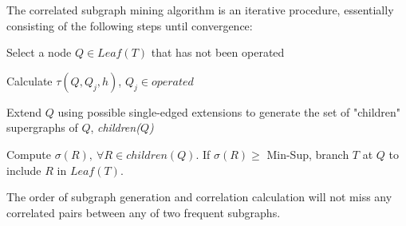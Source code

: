 
\par The correlated subgraph mining algorithm is an iterative procedure,
essentially consisting of the following steps until convergence: 

 Select a node $Q\in Leaf(T)$ that has not
been operated 

 Calculate $\tau(Q,Q_j,h)$, \forall 
$Q_j\in \textit{operated}$ 

 Extend $Q$ using possible single-edged
extensions to generate the set of "children" supergraphs of $Q$, \textit{children($Q$)}

 Compute $\sigma(R),\ \forall R\in children(Q)$. If
$\sigma(R)\ge$ {\sf Min-Sup}, branch $T$ at $Q$ to include $R$ in $Leaf(T)$.

\begin{thrm}
	The order of subgraph generation and correlation calculation will not miss
	any correlated pairs between any of two frequent subgraphs.
\end{thrm}

